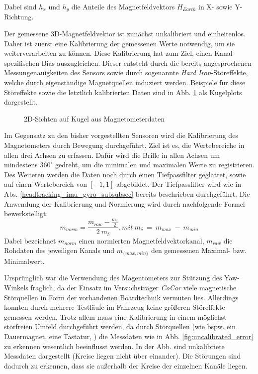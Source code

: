 Dabei sind $h_x$ und $h_y$ die Anteile des Magnetfeldvektors $H_{Earth}$ in X- sowie Y- Richtung.

Der gemessene 3D-Magnetfeldvektor ist zunächst unkalibriert und einheitenlos.
Daher ist zuerst eine Kalibrierung der gemessenen Werte notwendig, um sie weiterverarbeiten zu können.
Diese Kalibrierung hat zum Ziel, einen Kanal-spezifischen Bias auszugleichen. 
Dieser entsteht durch die bereits angesprochenen Messungenauigkeiten des Sensors sowie durch sogenannte \textit{Hard Iron}-Störeffekte, welche durch eigenständige Magnetquellen induziert werden.
Beispiele für diese Störeffekte sowie die letztlich kalibrierten Daten sind in Abb. \ref{fig:mag_kugel_plots} als Kugelplots dargestellt.

\begin{figure}[ht]
\centering
{}

\caption[]{2D-Sichten auf Kugel aus Magnetometerdaten}
\label{fig:mag_kugel_plots}
\end{figure}

Im Gegensatz zu den bisher vorgestellten Sensoren wird die Kalibrierung des Magnetometers durch Bewegung durchgeführt.
Ziel ist es, die Wertebereiche in allen drei Achsen zu erfassen.
Dafür wird die Brille in allen Achsen um mindestens $360^\circ$ gedreht, um die minimalen und maximalen Werte zu registrieren. 
Des Weiteren werden die Daten noch durch einen Tiefpassfilter geglättet, sowie auf einen Wertebereich von $[-1,1]$ abgebildet.
Der Tiefpassfilter wird wie in Abs. \ref{headtracking_imu_gyro_subsubsec} bereits beschrieben durchgeführt. 
Die Anwendung der Kalibrierung und Normierung wird durch nachfolgende Formel bewerkstelligt:
\begin{equation}
    m_{norm} = \frac{m_{raw}- \frac{m_{\delta}}{2}}{2~m_{\delta}}, {\scriptstyle mit~m_{\delta}~=~m_{max}~-~m_{min}}
\end{equation}
Dabei bezeichnet $m_{norm}$ einen normierten Magnetfeldvektorkanal, $m_{raw}$ die Rohdaten des jeweiligen Kanals und $m_{\lbrace max, min\rbrace}$ den gemessenen Maximal- bzw. Minimalwert.

Ursprünglich war die Verwendung des Magentometers zur Stützung des Yaw-Winkels fraglich, da der Einsatz im Versuchsträger \emph{CoCar} viele magnetische Störquellen in Form der vorhandenen Boardtechnik vermuten lies. 
Allerdings konnten durch mehrere Testläufe im Fahrzeug keine größeren Störeffekte gemessen werden. Trotz allem muss eine Kalibrierung in einem möglichst störfreien Umfeld durchgeführt werden, da durch Störquellen (wie bspw. ein Dauermagnet, eine Tastatur, \oae) die Messdaten wie in Abb. \ref{fig:uncalibrated_error} zu erkennen wesentlich beeinflusst werden. In der Abb. sind unkalibriete Messdaten dargestellt (Kreise liegen nicht über einander). Die Störungen sind dadurch zu erkennen, dass sie außerhalb der Kreise der einzelnen Kanäle liegen.

